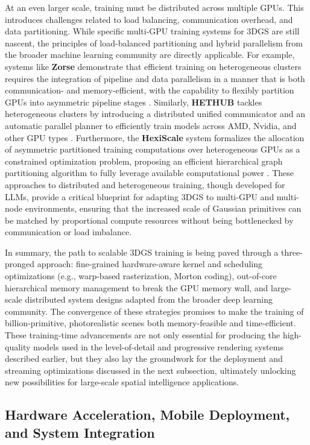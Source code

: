 \documentclass[11pt]{article}
\begin{document}
At an even larger scale, training must be distributed across multiple GPUs. This introduces challenges related to load balancing, communication overhead, and data partitioning. While specific multi-GPU training systems for 3DGS are still nascent, the principles of load-balanced partitioning and hybrid parallelism from the broader machine learning community are directly applicable. For example, systems like \textbf{Zorse} demonstrate that efficient training on heterogeneous clusters requires the integration of pipeline and data parallelism in a manner that is both communication- and memory-efficient, with the capability to flexibly partition GPUs into asymmetric pipeline stages \cite{ref471}. Similarly, \textbf{HETHUB} tackles heterogeneous clusters by introducing a distributed unified communicator and an automatic parallel planner to efficiently train models across AMD, Nvidia, and other GPU types \cite{ref472}. Furthermore, the \textbf{HexiScale} system formalizes the allocation of asymmetric partitioned training computations over heterogeneous GPUs as a constrained optimization problem, proposing an efficient hierarchical graph partitioning algorithm to fully leverage available computational power \cite{ref473}. These approaches to distributed and heterogeneous training, though developed for LLMs, provide a critical blueprint for adapting 3DGS to multi-GPU and multi-node environments, ensuring that the increased scale of Gaussian primitives can be matched by proportional compute resources without being bottlenecked by communication or load imbalance.

In summary, the path to scalable 3DGS training is being paved through a three-pronged approach: fine-grained hardware-aware kernel and scheduling optimizations (e.g., warp-based rasterization, Morton coding), out-of-core hierarchical memory management to break the GPU memory wall, and large-scale distributed system designs adapted from the broader deep learning community. The convergence of these strategies promises to make the training of billion-primitive, photorealistic scenes both memory-feasible and time-efficient. These training-time advancements are not only essential for producing the high-quality models used in the level-of-detail and progressive rendering systems described earlier, but they also lay the groundwork for the deployment and streaming optimizations discussed in the next subsection, ultimately unlocking new possibilities for large-scale spatial intelligence applications.

\subsection{Hardware Acceleration, Mobile Deployment, and System Integration}
\end{document}

